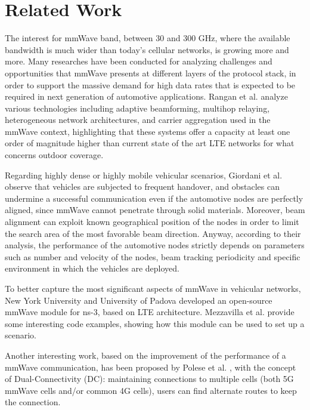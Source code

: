 \documentclass[conference,10pt]{IEEEtran}
\begin{document}
\section{Related Work}\label{sec:sota}

The interest for mmWave band, between 30 and 300 GHz, where the available bandwidth is much wider than today's cellular networks, is growing more and more. Many researches have been conducted for analyzing challenges and opportunities that mmWave presents at different layers of the protocol stack, in order to support the massive demand for high data rates that is expected to be required in next generation of automotive applications.
Rangan et al. \cite{mmwpac} analyze various technologies including adaptive beamforming, multihop relaying, heterogeneous network architectures, and carrier aggregation used in the mmWave context, highlighting that these systems offer a capacity at least one order of magnitude higher than current state of the art LTE networks for what concerns outdoor coverage.

Regarding highly dense or highly mobile vehicular scenarios, Giordani et al. \cite{mmvehicle} observe that vehicles are subjected to frequent handover, and obstacles can undermine a successful communication even if the automotive nodes are perfectly aligned, since mmWave cannot penetrate through solid materials. Moreover, beam alignment can exploit known geographical position of the nodes in order to limit the search area of the most favorable beam direction. Anyway, according to their analysis, the performance of the automotive nodes strictly depends on parameters such as number and velocity of the nodes, beam tracking periodicity and specific environment in which the vehicles are deployed.

To better capture the most significant aspects of mmWave in vehicular networks, New York University and University of Padova developed an open-source mmWave module for ns-3, based on LTE architecture. Mezzavilla et al. \cite{e2esim} provide some interesting code examples, showing how this module can be used to set up a scenario.

Another interesting work, based on the improvement of the performance of a mmWave communication, has been proposed by Polese et al. \cite{imphand}, with the concept of Dual-Connectivity (DC): maintaining connections to multiple cells (both 5G mmWave cells and/or common 4G cells), users can find alternate routes to keep the connection.
\end{document}
